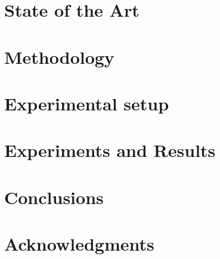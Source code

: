 \documentclass[conference]{IEEEtran}
\begin{document}

\section{State of the Art}
\label{sec:sota}


\section{Methodology}
\label{sec:met}


\section{Experimental setup}
\label{sec:exp}


\section{Experiments and Results}
\label{sec:res}


\section{Conclusions}


\section{Acknowledgments}





\newpage
\listoftodos[Notes]
\end{document}
